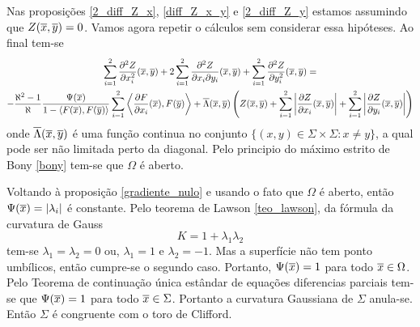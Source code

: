 \begin{demonstracao}
	Nas proposições \eqref{2_diff_Z_x}, \eqref{diff_Z_x_y} e \eqref{2_diff_Z_y} estamos assumindo que $Z(\overline{x},\overline{y}) = 0$. Vamos agora repetir o cálculos sem considerar essa hipóteses. Ao final tem-se
	\begin{multline*}
	\sum_{i=1}^2 \frac{\partial^2 Z}{\partial x_i^2}(\overline{x},\overline{y}) + 2 \sum_{i=1}^2 \frac{\partial^2 Z}{\partial x_i \partial y_i}(\overline{x},\overline{y}) + \sum_{i=1}^2 \frac{\partial^2 Z}{\partial y_i^2}(\overline{x},\overline{y}) =\\
	- \frac{\aleph^2 - 1}{\aleph} \frac{\Psi(\overline{x})}{1 - \langle F(\overline{x}), F(\overline{y}) \rangle} \sum_{i=1}^2 \left\langle \frac{\partial F}{\partial x_i}(\overline{x}), F(\overline{y}) \right\rangle + \overline{\Lambda}(\overline{x},\overline{y}) \left( Z(\overline{x},\overline{y}) + \sum_{i=1}^2 \left| \frac{\partial Z}{\partial x_i}(\overline{x},\overline{y}) \right| + \sum_{i=1}^2 \left| \frac{\partial Z}{\partial y_i}(\overline{x},\overline{y}) \right| \right)
	\end{multline*}
	onde $\overline{\Lambda}(\overline{x},\overline{y})$ é uma função continua no conjunto $\{ (x,y) \in \Sigma \times \Sigma: x \neq y \}$, a qual pode ser não limitada perto da diagonal.	
	Pelo principio do máximo estrito de Bony \ref{bony} tem-se que $\Omega$ é aberto.
\end{demonstracao}

Voltando à proposição \ref{gradiente_nulo} e usando o fato que $\Omega$ é aberto, então $\Psi(\overline{x})= |\lambda_i|$ é constante. Pelo teorema de Lawson \ref{teo_lawson}, da fórmula da curvatura de Gauss
\begin{equation*}
	K = 1 + \lambda_1 \lambda_2
\end{equation*}
tem-se $\lambda_1 = \lambda_2 = 0$ ou, $\lambda_1 = 1$ e $\lambda_2=-1$. Mas a superfície não tem ponto umbílicos, então cumpre-se o segundo caso. Portanto, $\Psi(\overline{x})=1$ para todo $\overline{x} \in \Omega$.	
Pelo Teorema de continuação única estândar de equações diferencias parciais \cite{Aronszajn1957} tem-se que $\Psi(\overline{x}) = 1$ para todo $\overline{x} \in \Sigma$. Portanto a curvatura Gaussiana de $\Sigma$ anula-se. Então $\Sigma$ é congruente com o toro de Clifford.